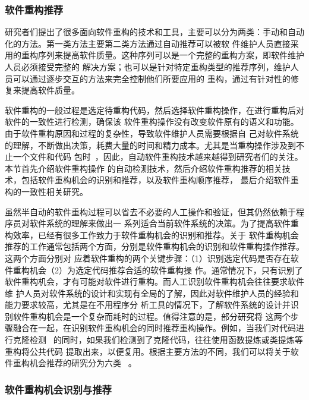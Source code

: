 \subsubsection{软件重构推荐}

研究者们提出了很多面向软件重构的技术和工具，主要可以分为两类：手动和自动化的方法。第一类方法主要第二类方法通过自动推荐可以被软
件维护人员直接采用的重构序列来提高软件质量\cite{harman2007pareto, kessentini2011design,
ouni2013maintainability, Silva2014}。这种序列可以是一个完整的重构方案，即软件维护人员必须接受完整的
解决方案；也可以是针对特定重构类型的推荐序列，维护人员可以通过逐步交互的方法来完全控制他们所要应用的
重构，通过有针对性的修复来提高软件质量。

软件重构的一般过程是选定待重构代码，然后选择软件重构操作，在进行重构后对软件的一致性进行检测，确保该
软件重构操作没有改变软件原有的语义和功能。由于软件重构原因和过程的复杂性，导致软件维护人员需要根据自
己对软件系统的理解，不断做出决策，耗费大量的时间和精力成本。尤其是当重构操作涉及到不止一个文件和代码
包时~\cite{liu2013monitor}，因此，自动软件重构技术越来越得到研究者们的关注。本节首先介绍软件重构操作
的自动检测技术，然后介绍软件重构推荐的相关技术，包括软件重构机会的识别和推荐，以及软件重构顺序推荐，
最后介绍软件重构的一致性相关研究。


虽然半自动的软件重构过程可以省去不必要的人工操作和验证，但其仍然依赖于程序员对软件系统的理解来做出一
系列适合当前软件系统的决策。为了提高软件重构效率，已经有很多工作致力于软件重构机会的识别和推荐。关于
软件重构机会推荐的工作通常包括两个方面，分别是软件重构机会的识别和软件重构操作推荐。这两个方面分别对
应着软件重构的两个关键步骤：（1）识别选定代码是否存在软件重构机会（2）为选定代码推荐合适的软件重构操
作。通常情况下，只有识别了软件重构机会，才有可能对软件进行重构。而人工识别软件重构机会往往要求软件维
护人员对软件系统的设计和实现有全局的了解，因此对软件维护人员的经验和能力要求较高，尤其是在不用程序分
析工具的情况下，了解软件系统的设计并识别软件重构机会是一个复杂而耗时的过程。值得注意的是，部分研究将
这两个步骤融合在一起，在识别软件重构机会的同时推荐重构操作。例如，当我们对代码进行克隆检测
~\cite{kamiya2002ccfinder}的同时，如果我们检测到了克隆代码，往往使用函数提炼或类提炼等重构将公共代码
提取出来，以便复用。根据主要方法的不同，我们可以将关于软件重构机会推荐的研究分为六类
~\cite{al2015identifying}。

\subsubsection{软件重构机会识别与推荐}

